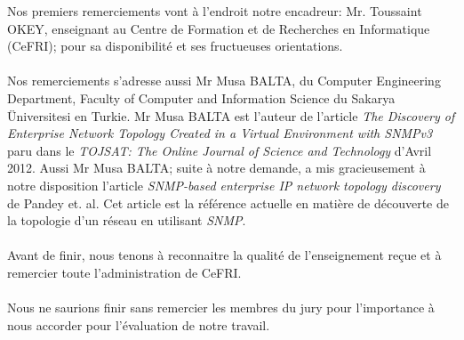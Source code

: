 \remerciements

Nos premiers remerciements vont à l'endroit notre encadreur: Mr. Toussaint OKEY, enseignant au Centre de Formation et de Recherches en Informatique (CeFRI); pour sa disponibilité et ses fructueuses orientations.
\paragraph{}
Nos remerciements s'adresse aussi Mr Musa BALTA, du Computer Engineering Department, Faculty of Computer and Information Science du Sakarya Üniversitesi en Turkie. Mr Musa BALTA est l'auteur de l'article \emph{The Discovery of Enterprise Network Topology Created in a Virtual Environment with SNMPv3} paru dans le \emph{TOJSAT: The Online Journal of Science and Technology} d'Avril 2012. Aussi Mr Musa BALTA; suite à notre demande,  a mis gracieusement à notre disposition l'article \emph{SNMP-based enterprise IP network topology discovery} de Pandey et. al. Cet article est la référence actuelle en matière de découverte de la topologie d'un réseau en utilisant \emph{SNMP}.
\paragraph{}

Avant de finir, nous tenons à reconnaitre la qualité de l'enseignement reçue et à remercier toute l'administration de CeFRI.
\paragraph{}
Nous ne saurions finir sans remercier les membres du jury pour l'importance à nous accorder pour l'évaluation de notre travail.
